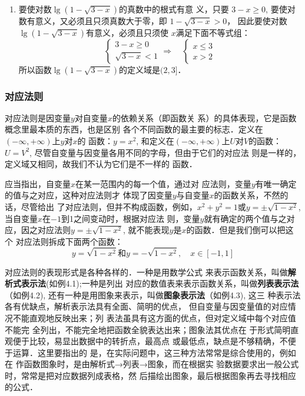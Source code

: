 \begin{solution}
\begin{enumerate}
\item 要使对数$\lg(1-\sqrt{3-x})$的真数中的根式有意
义，只要
$3-x\ge 0$, 
要使对数有意义，又必须且只须真数大于零，即
$1-\sqrt{3-x}>0$，
因此要使对数$\lg(1-\sqrt{3-x})$有意义，必须且只须使
$x$满足下面不等式组：
\[\begin{cases}
    3-x\ge 0\\
\sqrt{3-x}<1
\end{cases}\Rightarrow\quad \begin{cases}
    x\le 3\\
x>2
\end{cases}\]
所以函数$\lg(1-\sqrt{3-x})$的定义域是$(2,3]$． 

\end{enumerate}    
\end{solution}

\subsubsection{对应法则}
对应法则是因变量$y$对自变量$x$的依赖关系（即函数关
系）的具体表现，它是函数概念里最本质的东西，也是区别
各个不同函数的最主要的标志．定义在$(-\infty,+\infty)$上$y$对$x$的
函数：$y=x^2$, 和定义在$(-\infty,+\infty)$上$U$对$V$的函数：$U=V^2$, 
尽管自变量与因变量各用不同的字母，但由于它们的对应法
则是一样的，定义域又相同，故我们不认为它们是不一样的
函数．

应当指出，自变量$x$在某一范围内的每一个值，通过对
应法则，变量$y$有唯一确定的值与之对应，这种对应法则才
体现了因变量$y$与自变量$x$的函数关系，不然的话，尽管给出
了对应法则，但并不构成函数，例如，$x^2+y^2=1$或$y=
\pm\sqrt{1-x^2}$, 当自变量$x$在$-1$到1之间变动时，根据对应法
则，变量$y$就有确定的两个值与之对应，因之对应法则$y=
\pm\sqrt{1-x^2}$, 就不能表现$y$是$x$的函数．但是我们倒可以把这个
对应法则拆成下面两个函数：
\[y=\sqrt{1-x^2}\text{和}y=-\sqrt{1-x^2},\quad x\in [-1,1]\]

对应法则的表现形式是各种各样的．一种是用数学公式
来表示函数关系，叫做\textbf{解析式表示法}(如例4.1);一种是列出
对应的数值表来表示函数关系，叫做\textbf{列表表示法}（如例4.2),
还有一种是用图象来表示，叫做\textbf{图象表示法}（如例4.3), 这三
种表示法各有优缺点，解析表示法具有全面、简明的优点，
但自变量与因变量值的对应情况不能直观地反映出来；列
表法虽具有这方面的优点，但对定义域中每个对应值不能完
全列出，不能完全地把函数全貌表达出来；图象法其优点在
于形式简明直观便于比较，易显出数据中的转折点，最高点
或最低点，缺点是不够精确，不便于运算．这里要指出的
是，在实际问题中，这三种方法常常是综合使用的，例如在
作函数图象时，是由解析式→列表→图象，而在根据实
验数据要求出一般公式时，常常是把对应数据列成表格，然
后描绘出图象，最后根据图象再去寻找相应的公式．


